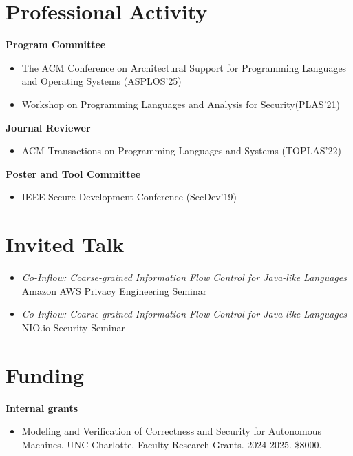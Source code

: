 \documentclass[11pt]{article}
\begin{document}
\section{Professional Activity}
\textbf{Program Committee}
\begin{itemize}
  \item The ACM Conference on Architectural Support for Programming Languages and Operating Systems (ASPLOS'25)
  \item Workshop on Programming Languages and Analysis for Security(PLAS'21)
\end{itemize}

\textbf{Journal Reviewer}
\begin{itemize}
\item  ACM Transactions on Programming Languages and Systems (TOPLAS'22)
\end{itemize}

\textbf{Poster and Tool Committee}
\begin{itemize}
\item  IEEE Secure Development Conference (SecDev'19)
\end{itemize}


\section{Invited Talk}


\begin{itemize}
\item \emph{Co-Inflow: Coarse-grained Information Flow Control for Java-like Languages} \\
  Amazon AWS Privacy Engineering Seminar
  

\item   \emph{Co-Inflow: Coarse-grained Information Flow Control for Java-like Languages} \\
  NIO.io Security Seminar 

\end{itemize}


\section{Funding}

\textbf{Internal grants}
\begin{itemize}
  \item Modeling and Verification of Correctness and Security for Autonomous Machines. UNC Charlotte. Faculty Research Grants. 2024-2025. \$8000. 
\end{itemize}
\end{document}
